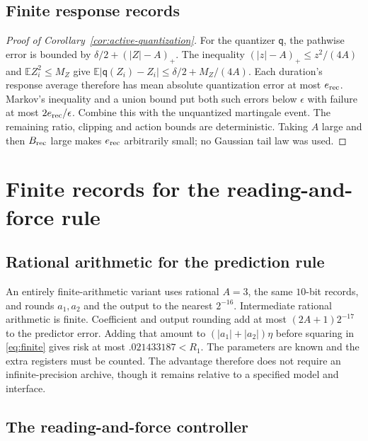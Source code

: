 \documentclass[12pt,a4paper]{article}
\newcommand{\E}{\mathbb E}
\begin{document}
\subsection{Finite response records}
\label{app:response-record-proof}

\begin{proof}[Proof of Corollary~\ref{cor:active-quantization}]
For the quantizer $\mathsf q$, the pathwise error is bounded by
$\delta/2+(|Z|-A)_+$.
The inequality $(|z|-A)_+\le z^2/(4A)$ and
$\E Z_i^2\le M_Z$ give $\E|\mathsf q(Z_i)-Z_i|
\le\delta/2+M_Z/(4A)$.
Each duration's response average therefore has mean absolute
quantization error at most $e_{\rm rec}$.
Markov's inequality and a union bound put both such errors below
$\epsilon$ with failure at most $2e_{\rm rec}/\epsilon$.
Combine this with the unquantized martingale event. The remaining
ratio, clipping and action bounds are deterministic.
Taking $A$ large and then $B_{\rm rec}$ large makes $e_{\rm rec}$
arbitrarily small; no Gaussian tail law was used.
\end{proof}

\section{Finite records for the reading-and-force rule}
\label{app:force-precision}

\subsection{Rational arithmetic for the prediction rule}

An entirely finite-arithmetic variant uses rational $A=3$, the same
$10$-bit records, and rounds $a_1,a_2$ and the output to the nearest
$2^{-16}$. Intermediate rational arithmetic is finite.
Coefficient and output rounding add at most $(2A+1)2^{-17}$ to the
predictor error. Adding that amount to $(|a_1|+|a_2|)\eta$ before
squaring in \eqref{eq:finite} gives risk at most $.021433187<R_1$.
The parameters are known and the extra registers must be counted.
The advantage therefore does not require an infinite-precision
archive, though it remains relative to a specified model and interface.

\subsection{The reading-and-force controller}
\end{document}
